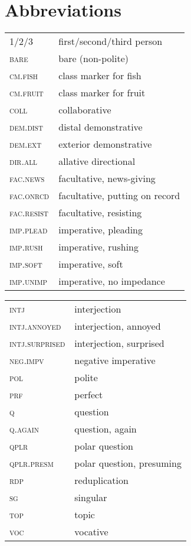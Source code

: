 \documentclass[output=paper]{langsci/langscibook}
\begin{document}
\section*{Abbreviations}
\begin{tabularx}{.52\textwidth}{>{\scshape}lQ}
1/2/3 & first/second/third person\\
bare & bare (non-polite)\\
cm.fish & class marker for fish \\
cm.fruit & class marker for fruit\\
coll & collaborative\\
dem.dist & distal demonstrative\\
dem.ext & exterior demonstrative\\
dir.all & allative directional\\
fac.news & facultative, news-giving\\
fac.onrcd & facultative, putting on record\\
fac.resist & facultative, resisting\\
imp.plead & imperative, pleading\\
imp.rush & imperative, rushing\\
imp.soft & imperative, soft\\
imp.unimp & imperative, no impedance
\end{tabularx}
\begin{tabularx}{.51\textwidth}{>{\scshape}lQ}
intj & interjection\\
intj.annoyed & interjection, annoyed\\
intj.surprised & interjection, surprised\\
neg.impv & negative imperative\\
pol & polite\\
prf & perfect\\
q & question\\
q.again & question, again\\
qplr & polar question\\
qplr.presm & polar question, presuming\\
rdp & reduplication\\
sg & singular\\
top & topic\\
voc & vocative
\end{tabularx}


\sloppy
\printbibliography[heading=subbibliography,notkeyword=this]
\end{document}
